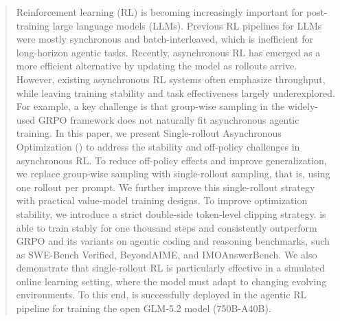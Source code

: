 \begin{abstract}
Reinforcement learning (RL) is becoming increasingly important for post-training large language models (LLMs). 
Previous RL pipelines for LLMs were mostly synchronous and batch-interleaved, which is inefficient for long-horizon agentic tasks. 
Recently, asynchronous RL has emerged as a more efficient alternative by updating the model as rollouts arrive. 
However, existing asynchronous RL systems often emphasize throughput, while leaving training stability and task effectiveness largely underexplored. 
For example, a key challenge is that group-wise sampling in the widely-used GRPO framework does not naturally fit asynchronous agentic training. 
In this paper, we present Single-rollout Asynchronous Optimization (\model{}) to address the stability and off-policy challenges in asynchronous RL. 
To reduce off-policy effects and improve generalization, we replace group-wise sampling with single-rollout sampling, that is, using one rollout per prompt. 
We further improve this single-rollout strategy with practical value-model training designs.
To improve optimization stability, we introduce a strict double-side token-level clipping strategy. 
\model is able to train stably for one thousand steps and consistently outperform GRPO and its variants on agentic coding and reasoning benchmarks, such as SWE-Bench Verified, BeyondAIME, and IMOAnswerBench.  
We also demonstrate that single-rollout RL is particularly effective in a simulated online learning setting, where the model must adapt to changing evolving environments. 
To this end, \model{} is successfully deployed in the agentic RL pipeline for training the open GLM-5.2 model (750B-A40B). 
\end{abstract}


